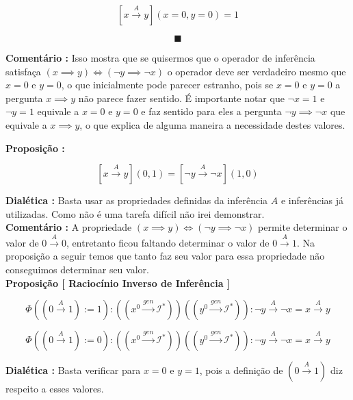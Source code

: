 \documentclass[10pt,a4paper]{report}
\begin{document}
$$ [ x\overset{A}{\rightarrow} y ](x=0,y=0) = 1 $$

$$\blacksquare $$

\textbf{Comentário :} Isso mostra que se quisermos que o operador de inferência satisfaça $(x \implies y ) \iff (\neg y \implies \neg x)$ o operador deve ser verdadeiro mesmo que $x=0$ e $y=0$, o que inicialmente pode parecer estranho, pois se $x=0$ e $y=0$ a pergunta $x \implies y$ não parece fazer sentido. É importante notar que $\neg x = 1$ e $\neg y = 1$ equivale a $x=0$ e $y=0$ e faz sentido para eles a pergunta $\neg y \implies \neg x$ que equivale a $x \implies y$, o que explica de alguma maneira a necessidade destes valores.

\hspace{\baselineskip}

\textbf{Proposição :}

$$ [ x \overset{A}{\rightarrow} y ](0,1) = [ \neg y \overset{A}{\rightarrow} \neg x ](1,0) $$

\textbf{Dialética :} Basta usar as propriedades definidas da inferência $A$ e inferências já utilizadas. Como não é uma tarefa difícil não irei demonstrar.\\

\textbf{Comentário :} A propriedade $(x \implies y ) \iff (\neg y \implies \neg x)$ permite determinar o valor de $ 0 \overset{A}{\rightarrow} 0 $, entretanto ficou faltando determinar o valor de $ 0 \overset{A}{\rightarrow} 1 $. Na proposição a seguir temos que tanto faz seu valor para essa propriedade não conseguimos determinar seu valor.\\

\textbf{Proposição [ Raciocínio Inverso de Inferência ]}

$$\Phi( ( 0 \overset{A}{\rightarrow} 1 ) := 1 ) : ((x^0 \overset{gen}{\rightarrow} \mathcal{I}^*)) ((y^0 \overset{gen}{\rightarrow} \mathcal{I}^*)) : \neg y \overset{A}{\rightarrow} \neg x = x \overset{A}{\rightarrow} y $$

$$\Phi( ( 0 \overset{A}{\rightarrow} 1 ) := 0 ) : ((x^0 \overset{gen}{\rightarrow} \mathcal{I}^*)) ((y^0 \overset{gen}{\rightarrow} \mathcal{I}^*)) : \neg y \overset{A}{\rightarrow} \neg x = x \overset{A}{\rightarrow} y $$

\textbf{Dialética :} Basta verificar para $x=0$ e $y=1$, pois a definição de $( 0 \overset{A}{\rightarrow} 1 )$ diz respeito a esses valores.\\
\end{document}
